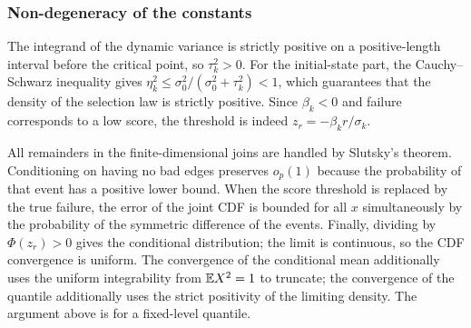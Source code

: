 \subsubsection{Non-degeneracy of the constants}
The integrand of the dynamic variance is strictly positive on a positive-length interval before the critical
point, so $\tau_k^2>0$. For the initial-state part, the Cauchy--Schwarz inequality gives
$\eta_k^2\le \sigma_0^2/(\sigma_0^2+\tau_k^2)<1$, which guarantees that the density of the selection law is
strictly positive. Since $\beta_k<0$ and failure corresponds to a low score, the threshold is indeed
$z_r=-\beta_k r/\sigma_k$.

All remainders in the finite-dimensional joins are handled by Slutsky's theorem. Conditioning on having no
bad edges preserves $o_p(1)$ because the probability of that event has a positive lower bound. When the score
threshold is replaced by the true failure, the error of the joint CDF is bounded for all $x$ simultaneously
by the probability of the symmetric difference of the events. Finally, dividing by $\Phi(z_r)>0$ gives the
conditional distribution; the limit is continuous, so the CDF convergence is uniform. The convergence of the
conditional mean additionally uses the uniform integrability from $\mathbb E X^2=1$ to truncate; the convergence of
the quantile additionally uses the strict positivity of the limiting density. The argument above is for a
fixed-level quantile.
